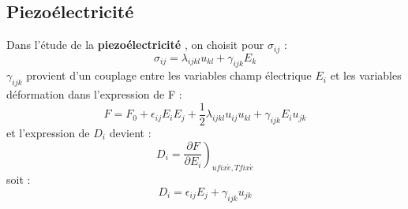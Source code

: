 \documentclass[12pt]{book}
\begin{document}
\subsection{Piezo\'electricit\'e }
Dans l'\'etude de la {\bf piezo\'electricit\'e }
\cite{ph:elect:LandauEle}, on 
choisit pour $ \sigma_{ij}$ :
\begin{equation}
\sigma_{ij}=\lambda_{ijkl}u_{kl}+\gamma_{ijk}E_k
\end{equation}
$\gamma_{ijk}$ provient d'un couplage entre les variables champ
\'electrique $E_i$ et les variables d\'eformation dans l'expression de F :
\begin{equation}
F=F_0+\epsilon_{ij}E_iE_j+\frac{1}{2}\lambda_{ijkl}u_{ij}u_{kl}+
\gamma_{ijk}E_iu_{jk} 
\end{equation}
et l'expression de $D_i$ devient :
\begin{equation}
D_i=\left.\frac{\partial F}{\partial E_i}\right)_{ufix\acute e,Tfix\acute e}
\end{equation}
soit :
\begin{equation}
D_i=\epsilon_{ij}E_j+\gamma_{ijk}u_{jk}
\end{equation}
\end{document}
